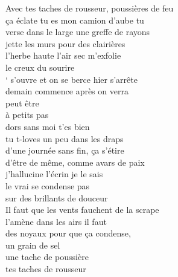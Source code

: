 \renewcommand{\baselinestretch}{1.25}
Avec tes taches de rousseur, poussières de feu\\
ça éclate tu es mon camion d’aube tu\\
verse dans le large une greffe de rayons\\
jette les murs pour des clairières\\
l’herbe haute l’air sec m’exfolie\\
le creux du sourire\\
‘ s’ouvre et on se berce hier s’arrête\\
demain commence après on verra\\
peut être\\
à petits pas\\
dors sans moi t’es bien\\
tu t-loves un peu dans les draps\\
d’une journée sans fin, ça s’étire \\
d’être de même, comme avars de paix \\
j’hallucine l’écrin je le sais\\
le vrai se condense pas\\
sur des brillants de douceur\\
Il faut que les vents fauchent de la scrape\\
l’amène dans les airs il faut\\
des noyaux pour que ça condense,\\
un grain de sel\\
une tache de poussière\\
tes taches de rousseur\\
